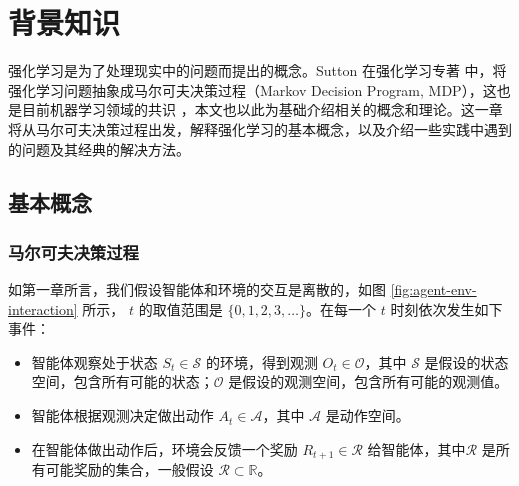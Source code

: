 
\chapter{背景知识}
\label{cha:background-knowledge}

强化学习是为了处理现实中的问题而提出的概念。Sutton 在强化学习专著 \cite{suttonReinforcementLearningIntroduction2018}中，将强化学习问题抽象成马尔可夫决策过程（Markov Decision Program, MDP），这也是目前机器学习领域的共识 \cite{mnihHumanlevelControlDeep2015} \cite{mnihAsynchronousMethodsDeep2016} \cite{hesselRainbowCombiningImprovements2018}  ，本文也以此为基础介绍相关的概念和理论。这一章将从马尔可夫决策过程出发，解释强化学习的基本概念，以及介绍一些实践中遇到的问题及其经典的解决方法。

\section{基本概念}
\subsection{马尔可夫决策过程}

如第一章所言，我们假设智能体和环境的交互是离散的，如图 \ref{fig:agent-env-interaction} 所示， $t$ 的取值范围是 $\{0, 1, 2,3, \dots\}$。在每一个 $t$ 时刻依次发生如下事件：
\begin{itemize}
    \item 智能体观察处于状态 $S_t \in \mathcal{S}$ 的环境，得到观测 $O_t \in \mathcal{O}$，其中 $\mathcal{S}$ 是假设的状态空间，包含所有可能的状态；$\mathcal{O}$ 是假设的观测空间，包含所有可能的观测值。
    \item 智能体根据观测决定做出动作 $A_t \in \mathcal{A}$，其中 $\mathcal{A}$ 是动作空间。
    \item 在智能体做出动作后，环境会反馈一个奖励 $R_{t+1} \in \mathcal{R}$ 给智能体，其中$\mathcal{R}$ 是所有可能奖励的集合，一般假设 $\mathcal{R} \subset \mathbb{R}$。
\end{itemize}

